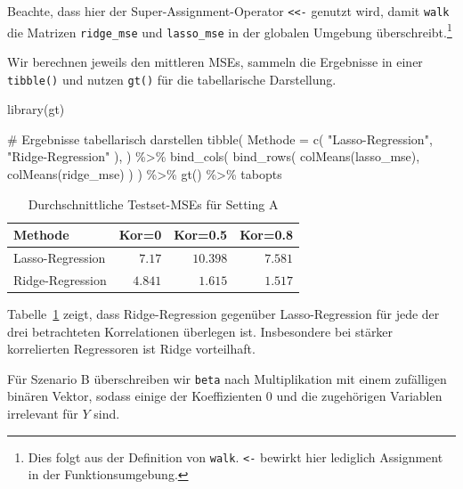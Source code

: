 \documentclass[
  a4paper,
  DIV=11,
  oneside]{scrreprt}
\newenvironment{Shaded}{\begin{snugshade}}{\end{snugshade}}
\newcommand{\AttributeTok}[1]{\textcolor[rgb]{0.40,0.45,0.13}{#1}}
\newcommand{\CommentTok}[1]{\textcolor[rgb]{0.37,0.37,0.37}{#1}}
\newcommand{\FunctionTok}[1]{\textcolor[rgb]{0.28,0.35,0.67}{#1}}
\newcommand{\NormalTok}[1]{\textcolor[rgb]{0.00,0.23,0.31}{#1}}
\newcommand{\SpecialCharTok}[1]{\textcolor[rgb]{0.37,0.37,0.37}{#1}}
\newcommand{\StringTok}[1]{\textcolor[rgb]{0.13,0.47,0.30}{#1}}
\begin{document}
Beachte, dass hier der Super-Assignment-Operator
\texttt{\textless{}\textless{}-} genutzt wird, damit \texttt{walk} die
Matrizen \texttt{ridge\_mse} und \texttt{lasso\_mse} in der globalen
Umgebung überschreibt.\footnote{Dies folgt aus der Definition von
  \texttt{walk}. \texttt{\textless{}-} bewirkt hier lediglich Assignment
  in der Funktionsumgebung.}

Wir berechnen jeweils den mittleren MSEs, sammeln die Ergebnisse in
einer \texttt{tibble()} und nutzen \texttt{gt()} für die tabellarische
Darstellung.

\begin{Shaded}
\begin{Highlighting}[]
\FunctionTok{library}\NormalTok{(gt)}

\CommentTok{\# Ergebnisse tabellarisch darstellen}
\FunctionTok{tibble}\NormalTok{(}
  \AttributeTok{Methode =} \FunctionTok{c}\NormalTok{(}
    \StringTok{"Lasso{-}Regression"}\NormalTok{, }
    \StringTok{"Ridge{-}Regression"}
\NormalTok{  ),}
\NormalTok{) }\SpecialCharTok{\%\textgreater{}\%}
  \FunctionTok{bind\_cols}\NormalTok{(}
    \FunctionTok{bind\_rows}\NormalTok{(}
      \FunctionTok{colMeans}\NormalTok{(lasso\_mse),}
      \FunctionTok{colMeans}\NormalTok{(ridge\_mse)  }
\NormalTok{    )    }
\NormalTok{  ) }\SpecialCharTok{\%\textgreater{}\%}
  \FunctionTok{gt}\NormalTok{() }\SpecialCharTok{\%\textgreater{}\%}
\NormalTok{  tabopts}
\end{Highlighting}
\end{Shaded}

\begin{longtable}{lrrr}

\caption{\label{tbl-lrsimA}Durchschnittliche Testset-MSEs für Setting A}

\tabularnewline

\toprule
Methode & Kor=0 & Kor=0.5 & Kor=0.8 \\ 
\midrule\addlinespace[2.5pt]
Lasso-Regression & $7.17$ & $10.398$ & $7.581$ \\ 
Ridge-Regression & $4.841$ & $1.615$ & $1.517$ \\ 
\bottomrule

\end{longtable}

Tabelle~\ref{tbl-lrsimA} zeigt, dass Ridge-Regression gegenüber
Lasso-Regression für jede der drei betrachteten Korrelationen überlegen
ist. Insbesondere bei stärker korrelierten Regressoren ist Ridge
vorteilhaft.

Für Szenario B überschreiben wir \texttt{beta} nach Multiplikation mit
einem zufälligen binären Vektor, sodass einige der Koeffizienten \(0\)
und die zugehörigen Variablen irrelevant für \(Y\) sind.
\end{document}

